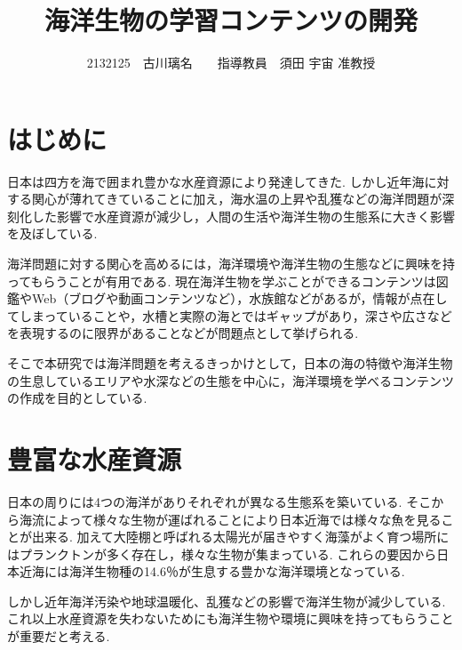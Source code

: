 \documentclass[twocolumn,a4j,10pt]{ltjsarticle}
\title{海洋生物の学習コンテンツの開発}
\author{2132125　古川璃名　　指導教員　須田 宇宙 准教授}
\date{}
\begin{document}
\maketitle

\section{はじめに}
\label{sec:description1}
日本は四方を海で囲まれ豊かな水産資源により発達してきた.
しかし近年海に対する関心が薄れてきている\cite{関心}ことに加え，海水温の上昇や乱獲などの海洋問題が深刻化した影響で水産資源が減少し，人間の生活や海洋生物の生態系に大きく影響を及ぼしている.\par
海洋問題に対する関心を高めるには，海洋環境や海洋生物の生態などに興味を持ってもらうことが有用である\cite{海洋環境}.
現在海洋生物を学ぶことができるコンテンツは図鑑やWeb（ブログや動画コンテンツなど），水族館などがあるが，情報が点在してしまっていることや，水槽と実際の海とではギャップがあり，深さや広さなどを表現するのに限界があることなどが問題点として挙げられる.\par
そこで本研究では海洋問題を考えるきっかけとして，日本の海の特徴や海洋生物の生息しているエリアや水深などの生態を中心に，海洋環境を学べるコンテンツの作成を目的としている.

\section{豊富な水産資源}
\label{sec:description2}
日本の周りには4つの海洋がありそれぞれが異なる生態系を築いている.
そこから海流によって様々な生物が運ばれることにより日本近海では様々な魚を見ることが出来る.
加えて大陸棚と呼ばれる太陽光が届きやすく海藻がよく育つ場所にはプランクトンが多く存在し，様々な生物が集まっている.
これらの要因から日本近海には海洋生物種の14.6％が生息する豊かな海洋環境となっている.\par
しかし近年海洋汚染や地球温暖化、乱獲などの影響で海洋生物が減少している.
これ以上水産資源を失わないためにも海洋生物や環境に興味を持ってもらうことが重要だと考える.
\end{document}
